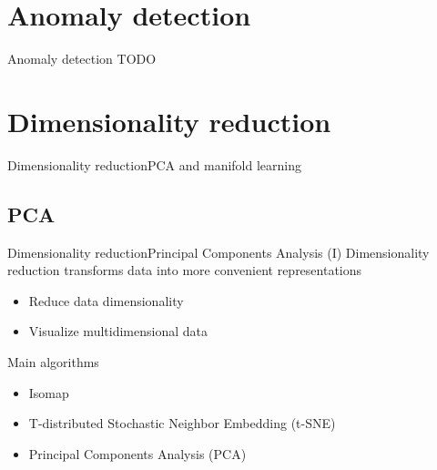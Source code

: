 \documentclass[10pt,compress]{beamer} %
\begin{document}
\section{Anomaly detection}

\begin{frame}{Anomaly detection}
    TODO
\end{frame}


\section{Dimensionality reduction}
{
\sectionheaderWhite %
\begin{frame}{Dimensionality reduction}{PCA and manifold learning}
\end{frame}
}

\subsection{PCA}

\begin{frame}{Dimensionality reduction}{Principal Components Analysis (I)}
	Dimensionality reduction transforms data into more convenient representations
	\begin{itemize}
		\item Reduce data dimensionality
		\item Visualize multidimensional data
	\end{itemize}

	Main algorithms
	\begin{itemize}
		\item Isomap
		\item T-distributed Stochastic Neighbor Embedding (t-SNE)
		\item Principal Components Analysis (PCA)
	\end{itemize}

\end{frame}
\end{document}
